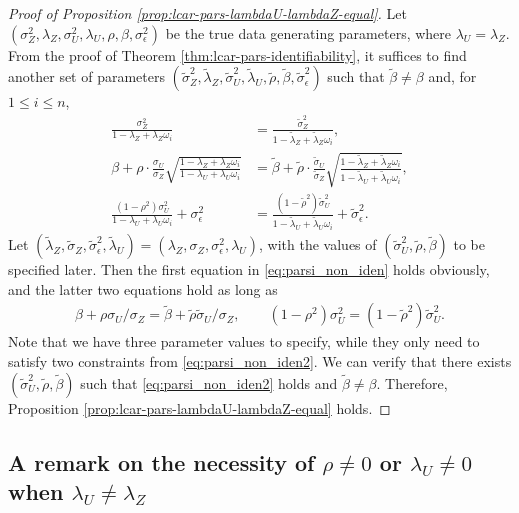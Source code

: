 \documentclass[11pt]{article}
\theoremstyle{definition}
\theoremstyle{remark}
\begin{document}
\begin{proof}[Proof of Proposition \ref{prop:lcar-pars-lambdaU-lambdaZ-equal}]

Let $(\sigma_Z^2, \lambda_Z, \sigma_U^2, \lambda_U, \rho, \beta, \sigma_\epsilon^2)$ be the true data generating parameters, 
where $\lambda_U=\lambda_Z$. 
From the proof of Theorem \ref{thm:lcar-pars-identifiability}, it suffices to find another set of parameters $(\tilde\sigma_Z^2, \tilde\lambda_Z, \tilde\sigma_U^2, \tilde\lambda_U, \tilde\rho, \tilde\beta, \tilde\sigma_\epsilon^2)$ such that 
$\tilde\beta \ne \beta$ and, for $1\le i \le n$, 
\begin{align}\label{eq:parsi_non_iden}
    \frac{\sigma_Z^2}{1-\lambda_Z+\lambda_Z\omega_i} & = \frac{\tilde\sigma_Z^2}{1-\tilde\lambda_Z+\tilde\lambda_Z\omega_i}, 
    \nonumber
    \\
\beta + \rho \cdot \frac{\sigma_U}{\sigma_Z} \sqrt{\frac{1-\lambda_Z + \lambda_Z \omega_i}{1-\lambda_U + \lambda_U \omega_i}} & = \tilde\beta + \tilde\rho \cdot \frac{\tilde\sigma_U}{\tilde \sigma_Z} \sqrt{\frac{1-\tilde \lambda_Z + \tilde \lambda_Z \omega_i}{1-\tilde\lambda_U + \tilde\lambda_U \omega_i}}, 
\nonumber
\\
\frac{(1-\rho^2)\sigma_U^2}{1-\lambda_U + \lambda_U\omega_i} + \sigma_\epsilon^2 & = \frac{(1-\tilde\rho^2)\tilde\sigma_U^2}{1-\tilde\lambda_U + \tilde\lambda_U\omega_i} + \tilde\sigma_\epsilon^2.
\end{align}
Let $(\tilde{\lambda}_Z, \tilde\sigma_Z, \tilde\sigma_\epsilon^2, \tilde\lambda_U) = (\lambda_Z, \sigma_Z, \sigma_\epsilon^2, \lambda_U)$, 
with the values of $(\tilde\sigma_U^2, \tilde\rho, \tilde\beta)$ to be specified later. 
Then the first equation in \eqref{eq:parsi_non_iden} holds obviously, and the latter two equations hold as long as  
\begin{align}\label{eq:parsi_non_iden2}
    \beta + \rho\sigma_U/\sigma_Z = \tilde\beta + \tilde\rho\tilde\sigma_U /\sigma_Z,
    \qquad 
    (1-\rho^2)\sigma_U^2 = (1-\tilde\rho^2)\tilde\sigma_U^2.
\end{align}
Note that we have three parameter values to specify, while they only need to satisfy two constraints from \eqref{eq:parsi_non_iden2}. 
We can verify that there exists $(\tilde\sigma_U^2, \tilde\rho, \tilde\beta)$ such that \eqref{eq:parsi_non_iden2} holds and $\tilde\beta \ne \beta$. 
Therefore, Proposition \ref{prop:lcar-pars-lambdaU-lambdaZ-equal} holds. 
\end{proof}

\subsection{A remark on the necessity of 
$\rho \ne 0$ or $\lambda_U \ne 0$
when $\lambda_{U} \neq \lambda_Z$} 
\end{document}

